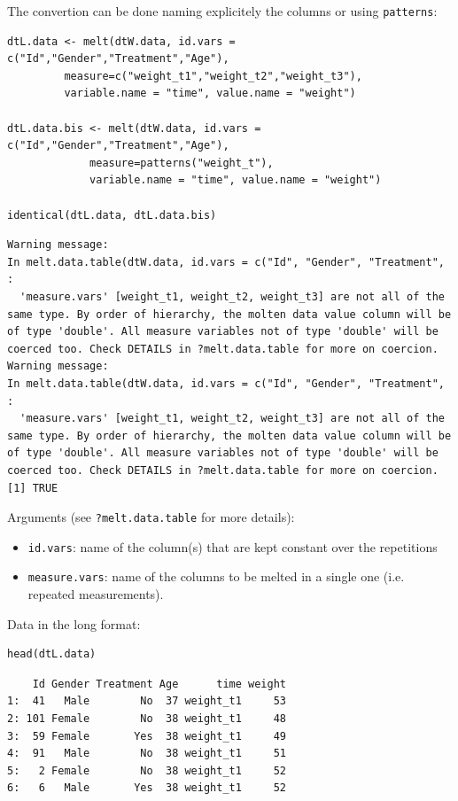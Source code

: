 \documentclass{article}
\begin{document}
The convertion can be done naming explicitely the columns or using \texttt{patterns}:
\lstset{language=r,label= ,caption= ,captionpos=b,numbers=none}
\begin{lstlisting}
dtL.data <- melt(dtW.data, id.vars = c("Id","Gender","Treatment","Age"), 
		 measure=c("weight_t1","weight_t2","weight_t3"), 
		 variable.name = "time", value.name = "weight")

dtL.data.bis <- melt(dtW.data, id.vars = c("Id","Gender","Treatment","Age"), 
		     measure=patterns("weight_t"), 
		     variable.name = "time", value.name = "weight")

identical(dtL.data, dtL.data.bis)
\end{lstlisting}

\begin{verbatim}
Warning message:
In melt.data.table(dtW.data, id.vars = c("Id", "Gender", "Treatment",  :
  'measure.vars' [weight_t1, weight_t2, weight_t3] are not all of the same type. By order of hierarchy, the molten data value column will be of type 'double'. All measure variables not of type 'double' will be coerced too. Check DETAILS in ?melt.data.table for more on coercion.
Warning message:
In melt.data.table(dtW.data, id.vars = c("Id", "Gender", "Treatment",  :
  'measure.vars' [weight_t1, weight_t2, weight_t3] are not all of the same type. By order of hierarchy, the molten data value column will be of type 'double'. All measure variables not of type 'double' will be coerced too. Check DETAILS in ?melt.data.table for more on coercion.
[1] TRUE
\end{verbatim}


Arguments (see \texttt{?melt.data.table} for more details):
\begin{itemize}
\item \texttt{id.vars}: name of the column(s) that are kept constant over the repetitions
\item \texttt{measure.vars}: name of the columns to be melted in a single one
(i.e. repeated measurements).
\end{itemize}

\bigskip

Data in the long format:
\lstset{language=r,label= ,caption= ,captionpos=b,numbers=none}
\begin{lstlisting}
head(dtL.data)
\end{lstlisting}

\begin{verbatim}
    Id Gender Treatment Age      time weight
1:  41   Male        No  37 weight_t1     53
2: 101 Female        No  38 weight_t1     48
3:  59 Female       Yes  38 weight_t1     49
4:  91   Male        No  38 weight_t1     51
5:   2 Female        No  38 weight_t1     52
6:   6   Male       Yes  38 weight_t1     52
\end{verbatim}
\end{document}
